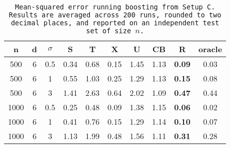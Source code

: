 \begin{table}[ht]
\centering
\begin{tabular}{cccccccccc}
  \hline
n & d & $\sigma$ & S & T & X & U & CB & R & oracle \\ 
  \hline
500 & 6 & 0.5 & 0.34 & 0.68 & 0.15 & 1.45 & 1.13 & \bf 0.09 & 0.03 \\ 
  500 & 6 & 1 & 0.55 & 1.03 & 0.25 & 1.29 & 1.13 & \bf 0.15 & 0.08 \\ 
  500 & 6 & 3 & 1.41 & 2.63 & 0.64 & 2.02 & 1.09 & \bf 0.47 & 0.44 \\ 
  1000 & 6 & 0.5 & 0.25 & 0.48 & 0.09 & 1.38 & 1.15 & \bf 0.06 & 0.02 \\ 
  1000 & 6 & 1 & 0.41 & 0.76 & 0.15 & 1.29 & 1.14 & \bf 0.10 & 0.07 \\ 
  1000 & 6 & 3 & 1.13 & 1.99 & 0.48 & 1.56 & 1.11 & \bf 0.31 & 0.28 \\ 
   \hline
\end{tabular}
\caption{\tt Mean-squared error running \texttt{boosting} from Setup C. Results are averaged across 200 runs, rounded to two decimal places, and reported on an independent test set of size $n$.} 
\label{table:setup3}
\end{table}
